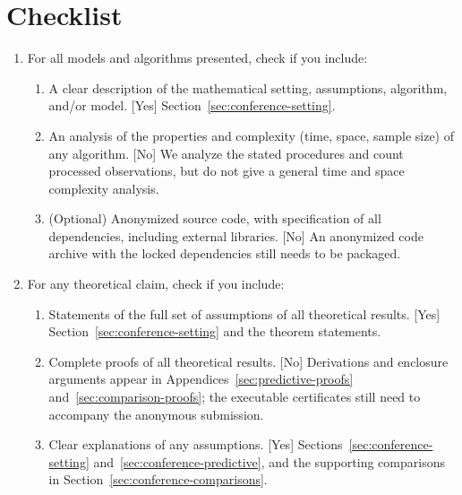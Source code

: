 \section*{Checklist}

\begin{enumerate}
  \item For all models and algorithms presented, check if you include:
        \begin{enumerate}
          \item A clear description of the mathematical setting, assumptions,
                algorithm, and/or model. [Yes]
                Section~\ref{sec:conference-setting}.
          \item An analysis of the properties and complexity (time, space,
                sample size) of any algorithm. [No] We analyze the stated
                procedures and count processed observations, but do not give a
                general time and space complexity analysis.
          \item (Optional) Anonymized source code, with specification of all
                dependencies, including external libraries. [No] An anonymized
                code archive with the locked dependencies still needs to be
                packaged.
        \end{enumerate}

  \item For any theoretical claim, check if you include:
        \begin{enumerate}
          \item Statements of the full set of assumptions of all theoretical
                results. [Yes] Section~\ref{sec:conference-setting} and the
                theorem statements.
          \item Complete proofs of all theoretical results. [No] Derivations and
                enclosure arguments appear in
                Appendices~\ref{sec:predictive-proofs}
                and~\ref{sec:comparison-proofs}; the executable
                certificates still need to accompany the anonymous submission.
          \item Clear explanations of any assumptions. [Yes]
                Sections~\ref{sec:conference-setting}
                and~\ref{sec:conference-predictive}, and the supporting
                comparisons in Section~\ref{sec:conference-comparisons}.
        \end{enumerate}


\end{enumerate}
